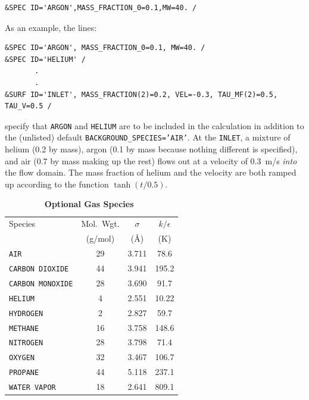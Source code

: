 \documentclass[11pt]{book}
\newcommand{\ct}{\tt\small}
\begin{document}
\footnotesize
\begin{verbatim}
&SPEC ID='ARGON',MASS_FRACTION_0=0.1,MW=40. /
\end{verbatim}
\normalsize



As an example, the lines:

\footnotesize
\begin{verbatim}
&SPEC ID='ARGON', MASS_FRACTION_0=0.1, MW=40. /
&SPEC ID='HELIUM' /
       .
       .
&SURF ID='INLET', MASS_FRACTION(2)=0.2, VEL=-0.3, TAU_MF(2)=0.5, TAU_V=0.5 /
\end{verbatim}
\normalsize
specify that {\ct ARGON} and {\ct HELIUM} are to be included in the calculation
in addition to the (unlisted) default
{\ct BACKGROUND\_SPECIES='AIR'}. At
the {\ct INLET}, a mixture of helium (0.2 by mass), argon (0.1 by mass
because nothing different is specified), and air (0.7 by mass making
up the rest) flows out at a velocity of 0.3~m/s {\em into} the flow
domain. The mass fraction of helium and the velocity are both
ramped up according to the function $\tanh(t/0.5)$.


\begin{table}[t]
\begin{center}
\caption{\bf Optional Gas Species~\cite{Reid:1}}
\label{tab:gasspecies}
\vspace{0.1in}
\begin{tabular}{|l|c|c|c|}
\hline
Species &   Mol.~Wgt.        & $\sigma$  & $k/\epsilon$  \\
        &   (g/mol)          & (\AA)     & (K)            \\ \hline
\hline
{\ct AIR}             & 29   & 3.711     & 78.6           \\ \hline
{\ct CARBON DIOXIDE}  & 44   & 3.941     &195.2           \\ \hline
{\ct CARBON MONOXIDE} & 28   & 3.690     & 91.7           \\ \hline
{\ct HELIUM}          &  4   & 2.551     & 10.22          \\ \hline
{\ct HYDROGEN}        &  2   & 2.827     & 59.7           \\ \hline
{\ct METHANE}         & 16   & 3.758     &148.6           \\ \hline
{\ct NITROGEN}        & 28   & 3.798     & 71.4           \\ \hline
{\ct OXYGEN}          & 32   & 3.467     &106.7           \\ \hline
{\ct PROPANE}         & 44   & 5.118     &237.1           \\ \hline
{\ct WATER VAPOR}     & 18   & 2.641     &809.1           \\ \hline
\end{tabular}
\end{center}
\end{table}
\end{document}

